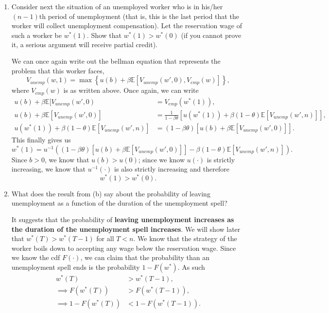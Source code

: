 \documentclass[11pt,english]{article}
\begin{document}
\begin{enumerate}
 \item Consider next the situation of an unemployed worker who is in his/her
        $(n-1)$th period of unemployment (that is, this is the last period that
        the worker will collect unemployment compensation). Let the reservation
        wage of such a worker be $w^*(1)$. Show that $w^*(1) > w^*(0)$ (if you
        cannot prove it, a serious argument will receive partial credit).
 \begin{solution}
 We can once again write out the bellman equation that represents the problem that this worker faces,
$$V_{unemp}(w, 1) = \max\left\{u(b) + \beta\mathbb{E}[V_{unemp}(w', 0),V_{emp}(w) ]\right\},$$ where $V_{emp}(w)$ is as written above. Once again, we can write 
\begin{align*}
u(b) + \beta\mathbb{E}[V_{unemp}(w', 0) &= V_{emp}(w^*(1)),\\
 u(b) + \beta \mathbb{E}\left[V_{unemp}(w',0)\right] &= \frac{1}{1 - \beta \theta}\left[u(w^*(1)) + \beta (1 -\theta)\mathbb{E}[V_{unemp}(w',n)]\right],\\
 u(w^*(1)) + \beta (1 -\theta)\mathbb{E}[V_{unemp}(w',n)] &= (1 - \beta \theta) \left[u(b) + \beta \mathbb{E}\left[V_{unemp}(w',0)\right]\right].
\end{align*}This finally gives us $$w^*(1) = u^{-1}\left((1 - \beta \theta) \left[u(b) + \beta \mathbb{E}\left[V_{unemp}(w',0)\right]\right] - \beta (1 -\theta)\mathbb{E}[V_{unemp}(w',n)]\right).$$ Since $b > 0$, we know that $u(b) > u(0)$; since we know $u(\cdot)$ is strictly increasing, we know that $u^{-1}(\cdot)$ is also strictly increasing and therefore 
$$w^*(1) > w^*(0).$$
 \end{solution}
 
 \item What does the result from (b) say about the probability of leaving
 unemployment as a function of the duration of the unemployment spell?
 \begin{solution}
 It suggests that the probability of \textbf{leaving unemployment increases as the duration of the unemployment spell increases}. We will show later that $w^*(T) > w^*(T-1)$ for all $T < n$. We know that the strategy of the worker boils down to accepting any wage below the reservation wage. Since we know the cdf $F(\cdot)$, we can claim that the probability than an unemployment spell ends is the probability $1 - F(w^*)$. As such 
\begin{align*}
w^*(T) &> w^*(T-1),\\
 \implies F(w^*(T)) &> F(w^*(T-1)),\\
 \implies 1- F(w^*(T)) &< 1 - F(w^*(T-1)).
\end{align*}
 \end{solution}
 

\end{enumerate}
\end{document}
